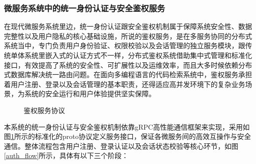 \documentclass[UTF8,a4paper,12pt]{ctexart}
\numberwithin{equation}{section}
\begin{document}
\subsubsection{微服务系统中的统一身份认证与安全鉴权服务}
在现代微服务系统里边，统一身份认证跟安全鉴权机制属于保障系统安全性、数据完整性以及用户隐私的核心基础设施，所说的鉴权服务，是在多服务协同的分布式系统当中，专门负责用户身份验证、权限校验以及会话管理的独立服务模块，跟传统单体系统里嵌入式的认证方式不一样，分布式鉴权系统借助集中式管理和标准化接口，有效提高了系统的安全性、可扩展性以及运维效率，而且大多时候依赖分布式数据库解决统一路由问题。在面向多编程语言的代码检索系统中，鉴权服务承担着用户注册、登录以及会话管理的基本职责，还得适应高并发环境下的复杂业务场景，为系统的安全运行和用户体验提供坚实保障。\par
\begin{figure}[H]
	\caption{鉴权服务协议}
	\label{auth}
\end{figure}
本系统的统一身份认证与安全鉴权机制依靠gRPC高性能通信框架来实现，采用如图\ref{auth}所示的标准化的proto协议定义服务接口，保证各微服务间的高效互操作与安全通信。整体流程包含用户注册、登录认证以及会话状态校验等核心环节，如图\ref{auth_flow}所示，具体有以下三个阶段：\par
\end{document}
